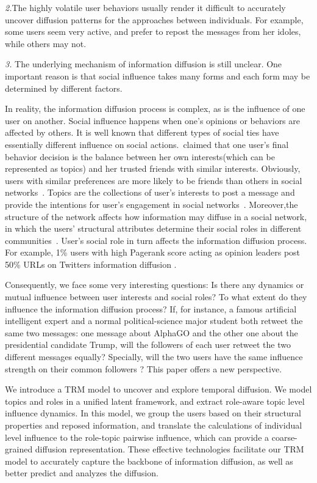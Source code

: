 \documentclass[runningheads,a4paper]{llncs}
\begin{document}
 \emph{ 2.}The highly volatile user behaviors usually render it difficult to accurately uncover diffusion patterns for the approaches between individuals. For example, some users seem very active, and prefer to repost the messages from her idoles, while others may not.

  \emph{3.} The underlying mechanism of information diffusion is still unclear. One important reason is that social influence takes many forms and each form may be determined by different factors.

In reality, the information diffusion process is complex, as is the influence of one user on another. Social influence happens when one's opinions or behaviors are affected by others. It is well known that different types of social ties have essentially different influence on social actions.~\cite{Barbieri2012Topic,xu2012modeling,Zhang2014Role}claimed that one user's final behavior decision is the balance between her own interests(which can be represented as topics) and her trusted friends with similar interests. Obviously, users with similar preferences are more likely to be friends than others in social networks~\cite{wahba1973maslow,burt2009structural}. Topics are the collections of user's interests to post a message and provide the intentions for user's engagement in social networks~\cite{Pinto2014Modeling,xu2012modeling}. Moreover,the structure of the network affects how information may diffuse in a social network, in which the users' structural attributes determine their social roles in different communities~\cite{Wasserman1994Social,yang2015rain}. User's social role in turn affects the information diffusion process. For example, 1\% users with high Pagerank score \cite{page1999pagerank} acting as opinion leaders post 50\% URLs on Twitters information diffusion \cite{wu2011says}.

Consequently, we face some very interesting questions: Is there any dynamics or mutual influence between user interests and social roles? To what extent do they influence the information diffusion process? If, for instance, a famous artificial intelligent expert and a normal political-science major student both retweet the same two messages: one message about AlphaGO and the other one about the presidential candidate Trump, will the followers of each user retweet the two different messages equally? Specially, will the two users have the same influence strength on their common followers ? This paper offers a new perspective.

We introduce a TRM model to uncover and explore temporal diffusion. We model topics and roles in a unified latent framework, and extract role-aware topic level influence dynamics.  In this model, we group the users based on their structural properties and reposed information, and translate the calculations of individual level influence to the role-topic pairwise influence, which can provide a coarse-grained diffusion representation. These effective technologies facilitate our TRM model to accurately capture the backbone of information diffusion, as well as better predict and analyzes the diffusion.
\end{document}
